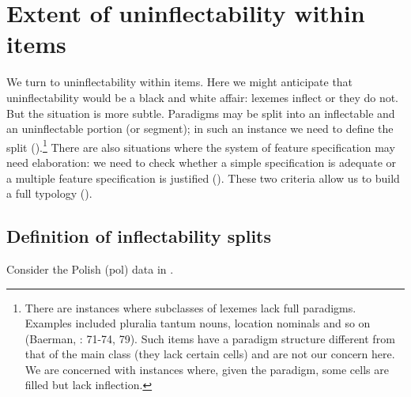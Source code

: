 \documentclass[output=paper]{langscibook}
\begin{document}
\section{\textbf{Extent} \textbf{of} \textbf{uninflectability} \textbf{within} \textbf{items}}

We turn to uninflectability within items. Here we might anticipate that uninflectability would be a black and white affair: lexemes inflect or they do not. But the situation is more subtle. Paradigms may be split into an inflectable and an uninflectable portion (or segment); in such an instance we need to define the split ().\footnote{ \textrm{There are instances where subclasses of lexemes lack full paradigms. Examples included pluralia tantum nouns, location nominals and so on (Baerman, \citealt{BrownCorbett2017}: 71-74, 79). Such items have a paradigm structure different from that of the main class (they lack certain cells) and are not our concern here. We are concerned with instances where, given the paradigm, some cells are filled but lack inflection.} } There are also situations where the system of feature specification may need elaboration: we need to check whether a simple specification is adequate or a multiple feature specification is justified (). These two criteria allow us to build a full typology (). 

\subsection{\textbf{Definition} \textbf{of} \textbf{inflectability} \textbf{splits}}

Consider the Polish (pol) data in . 
\end{document}
